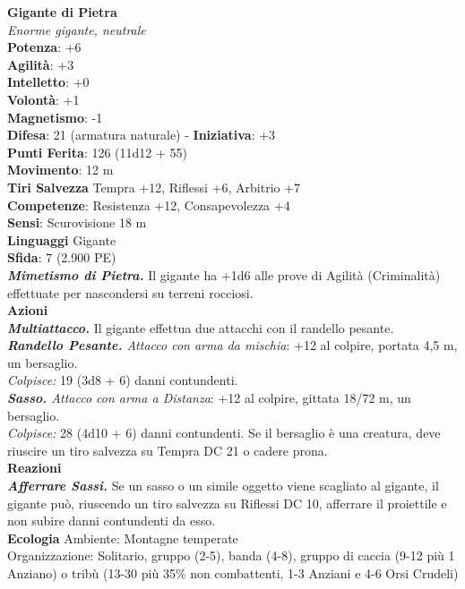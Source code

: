 \begin{multicols}{2}
\medskip\textbf{Gigante di Pietra}\\
\emph{Enorme gigante, neutrale}\\
\textbf{Potenza}: +6\\
\textbf{Agilità}: +3\\
\textbf{Intelletto}: +0\\
\textbf{Volontà}: +1\\
\textbf{Magnetismo}: -1\\
\textbf{Difesa}: 21 (armatura naturale) - \textbf{Iniziativa}: +3\\
\textbf{Punti Ferita}: 126 (11d12 + 55)\\
\textbf{Movimento}: 12 m\\
\textbf{Tiri Salvezza} Tempra +12, Riflessi +6, Arbitrio +7\\
\textbf{Competenze}: Resistenza +12, Consapevolezza +4\\
\textbf{Sensi}: Scurovisione 18 m\\
\textbf{Linguaggi} Gigante\\
\textbf{Sfida}: 7 (2.900 PE)\smallskip\\
\emph{\textbf{Mimetismo di Pietra.}} Il gigante ha +1d6 alle prove di Agilità (Criminalità) effettuate per nascondersi su terreni rocciosi.\\
\smallskip\textbf{Azioni}\\
\emph{\textbf{Multiattacco.}} Il gigante effettua due attacchi con il randello pesante.\\
\emph{\textbf{Randello Pesante.} Attacco con arma da mischia}: +12 al colpire, portata 4,5 m, un bersaglio.\\
\emph{Colpisce:} 19 (3d8 + 6) danni contundenti.\\
\emph{\textbf{Sasso.} Attacco con arma a Distanza}: +12 al colpire, gittata 18/72 m, un bersaglio.\\
\emph{Colpisce:} 28 (4d10 + 6) danni contundenti. Se il bersaglio è una creatura, deve riuscire un tiro salvezza su Tempra DC  21 o cadere prona.\\
\textbf{Reazioni}\\
\emph{\textbf{Afferrare Sassi.}} Se un sasso o un simile oggetto viene scagliato al gigante, il gigante può, riuscendo un tiro salvezza su Riflessi DC 10, afferrare il proiettile e non subire danni contundenti da esso.\\
\textbf{Ecologia}
Ambiente: Montagne temperate\\
Organizzazione: Solitario, gruppo (2-5), banda (4-8), gruppo di caccia (9-12 più 1 Anziano) o tribù (13-30 più 35\% non combattenti, 1-3 Anziani e 4-6 Orsi Crudeli)\\

\end{multicols}

